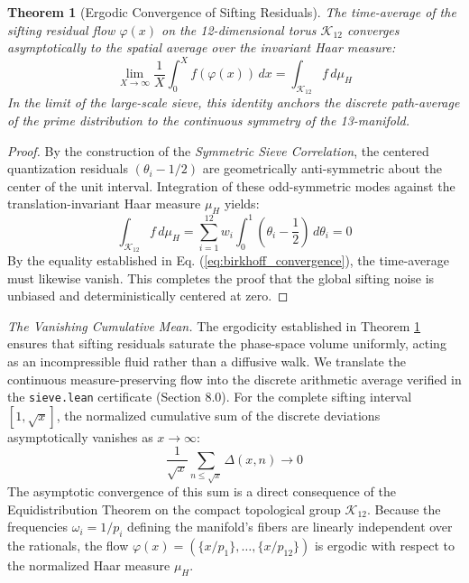 \documentclass[sn-mathphys-num, pdflatex, referee]{sn-jnl}
\newtheorem{theorem}{Theorem}[section]
\begin{document}
\begin{theorem}[Ergodic Convergence of Sifting Residuals]
\label{the:ergodic_convergence}
The time-average of the sifting residual flow $\varphi(x)$ on the 12-dimensional torus $\mathcal{K}_{12}$ converges asymptotically to the spatial average over the invariant Haar measure:
\begin{equation}
\lim_{X \to \infty} \frac{1}{X} \int_{0}^{X} f(\varphi(x)) \, dx = \int_{\mathcal{K}_{12}} f \, d\mu_H
\label{eq:birkhoff_convergence}
\end{equation}
In the limit of the large-scale sieve, this identity anchors the discrete path-average of the prime distribution to the continuous symmetry of the 13-manifold.
\end{theorem}

\begin{proof}
By the construction of the \textit{Symmetric Sieve Correlation}, the centered quantization residuals $(\theta_i - 1/2)$ are geometrically anti-symmetric about the center of the unit interval. Integration of these odd-symmetric modes against the translation-invariant Haar measure $\mu_H$ yields:
\begin{equation}
\int_{\mathcal{K}_{12}} f \, d\mu_H = \sum_{i=1}^{12} w_i \int_{0}^{1} \left( \theta_i - \frac{1}{2} \right) \, d\theta_i = 0
\end{equation}
By the equality established in Eq. (\ref{eq:birkhoff_convergence}), the time-average must likewise vanish. This completes the proof that the global sifting noise is unbiased and deterministically centered at zero.
\end{proof}

\noindent \textit{The Vanishing Cumulative Mean.}
The ergodicity established in Theorem \ref{the:ergodic_convergence} ensures that sifting residuals saturate the phase-space volume uniformly, acting as an incompressible fluid rather than a diffusive walk. We translate the continuous measure-preserving flow into the discrete arithmetic average verified in the \texttt{sieve.lean} certificate (Section 8.0). For the complete sifting interval $[1, \sqrt{x}]$, the normalized cumulative sum of the discrete deviations asymptotically vanishes as $x \to \infty$:
\begin{equation}
\frac{1}{\sqrt{x}} \sum_{n \le \sqrt{x}} \Delta(x, n) \to 0
\label{eq:final_ergodic_sum}
\end{equation}
The asymptotic convergence of this sum is a direct consequence of the Equidistribution Theorem \cite{Kuipers2012} on the compact topological group $\mathcal{K}_{12}$. Because the frequencies $\omega_i = 1/p_i$ defining the manifold's fibers are linearly independent over the rationals, the flow $\varphi(x) = ( \{x/p_1\}, \dots, \{x/p_{12}\} )$ is ergodic with respect to the normalized Haar measure $\mu_H$. 
\end{document}
